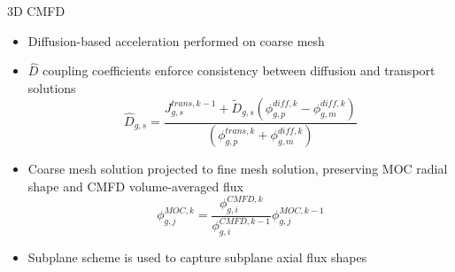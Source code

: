 \begin{frame}[t]{3D CMFD}
    
        \begin{itemize}
          \item Diffusion-based acceleration performed on coarse mesh
          \item $\hat{D}$ coupling coefficients enforce consistency between diffusion and transport solutions
          \begin{equation*}\scriptstyle
          \hat{D}_{g,s} = \frac{J_{g,s}^{trans,k-1} + 
            \tilde{D}_{g,s}\left(\phi_{g,p}^{diff,k} - 
            \phi_{g,m}^{diff,k}\right)}{\left(\phi_{g,p}^{trans,k} + 
            \phi_{g,m}^{diff,k}\right)}
          \end{equation*}
          \item Coarse mesh solution projected to fine mesh solution, preserving MOC radial shape and CMFD volume-averaged flux
          \begin{equation*}\scriptstyle
          \phi_{g,j}^{MOC,k} = \frac{\phi_{g,i}^{CMFD,k}}{\phi_{g,i}^{CMFD,k-1}} \phi_{g,j}^{MOC,k-1}
          \end{equation*}
          \item Subplane scheme is used to capture subplane axial flux shapes
        \end{itemize}
    
\end{frame}


